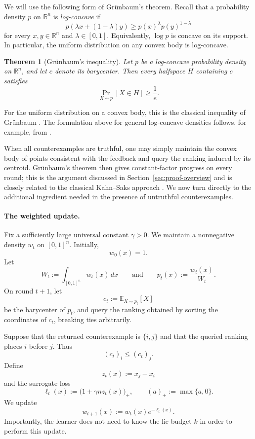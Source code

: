 \documentclass[11pt]{article}
\newtheorem{theorem}{Theorem}[section]
\theoremstyle{definition}
\theoremstyle{remark}
\begin{document}
We will use the following form of Gr\"unbaum's theorem. Recall that a
probability density $p$ on $\mathbb R^n$ is \emph{log-concave} if
\[
    p(\lambda x+(1-\lambda)y)
    \geq
    p(x)^\lambda p(y)^{1-\lambda}
\]
for every $x,y\in\mathbb R^n$ and $\lambda\in[0,1]$. Equivalently,
$\log p$ is concave on its support. In particular, the uniform distribution
on any convex body is log-concave.

\begin{theorem}[Gr\"unbaum's inequality]
\label{thm:grunbaum}
Let $p$ be a log-concave probability density on $\mathbb R^n$, and let
$c$ denote its barycenter. Then every halfspace $H$ containing $c$ satisfies
\[
    \Pr_{X\sim p}[X\in H]\geq \frac1e.
\]
\end{theorem}

For the uniform distribution on a convex body, this is the classical
inequality of Gr\"unbaum \cite{Grunbaum1960}. The formulation above for
general log-concave densities follows, for example, from
\cite[Lemma~5.12]{LovaszVempala2007}.

When all counterexamples are truthful, one may simply maintain the convex
body of points consistent with the feedback and query the ranking induced by
its centroid. Gr\"unbaum's theorem then gives constant-factor progress on
every round; this is the argument discussed in Section~\ref{sec:proof-overview}
and is closely related to the classical Kahn--Saks approach
\cite{KahnSaks1984}. We now turn directly to the additional ingredient needed
in the presence of untruthful counterexamples.

\paragraph{The weighted update.}

Fix a sufficiently large universal constant $\gamma>0$. We maintain a
nonnegative density $w_t$ on $[0,1]^n$. Initially,
\[
    w_0(x)=1.
\]
Let
\[
    W_t:=\int_{[0,1]^n}w_t(x)\,dx
    \qquad\text{and}\qquad
    p_t(x):=\frac{w_t(x)}{W_t}.
\]
On round $t+1$, let
\[
    c_t:=\mathbb E_{X\sim p_t}[X]
\]
be the barycenter of $p_t$, and query the ranking obtained by sorting the
coordinates of $c_t$, breaking ties arbitrarily.

Suppose that the returned counterexample is $\{i,j\}$ and that the queried
ranking places $i$ before $j$. Thus
\[
    (c_t)_i\leq(c_t)_j.
\]
Define
\[
    z_t(x):=x_j-x_i
\]
and the surrogate loss
\[
    \ell_t(x):=
    \bigl(1+\gamma n z_t(x)\bigr)_+,
    \qquad
    (a)_+:=\max\{a,0\}.
\]
We update
\[
    w_{t+1}(x)
    :=
    w_t(x)e^{-\ell_t(x)}.
    \tag{1}\label{eq:weight-update}
\]
Importantly, the learner does not need to know the lie budget $k$ in order
to perform this update.
\end{document}
